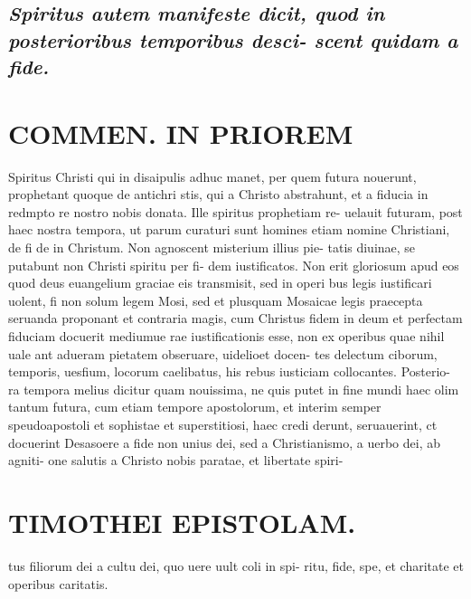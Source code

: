 \documentclass{article}
\begin{document}
\begin{pages}
\subsection*{\textit{\huge\textbf{S}\normalsize piritus autem manifeste dicit, quod in posterioribus temporibus desci- scent quidam a fide. }}
\section*{COMMEN. IN PRIOREM }
\marginpar{[ p.94 ]}\pstart Spiritus Christi qui in disaipulis adhuc manet, per quem futura nouerunt, prophetant quoque de antichri stis, qui a Christo abstrahunt, et a fiducia in redmpto re nostro nobis donata. Ille spiritus prophetiam re- uelauit futuram, post haec nostra tempora, ut parum curaturi sunt homines etiam nomine Christiani, de fi de in Christum. Non agnoscent misterium illius pie- tatis diuinae, se putabunt non Christi spiritu per fi- dem iustificatos. Non erit gloriosum apud eos quod deus euangelium graciae eis transmisit, sed in operi bus legis iustificari uolent, fi non solum legem Mosi, sed et plusquam Mosaicae legis praecepta seruanda proponant et contraria magis, cum Christus fidem in deum et perfectam fiduciam docuerit mediumue rae iustificationis esse, non ex operibus quae nihil uale ant adueram pietatem obseruare, uidelioet docen- tes delectum ciborum, temporis, uesfium, locorum caelibatus, his rebus iusticiam collocantes. Posterio- ra tempora melius dicitur quam nouissima, ne quis putet in fine mundi haec olim tantum futura, cum etiam tempore apostolorum, et interim semper speudoapostoli et sophistae et superstitiosi, haec credi derunt, seruauerint, ct docuerint Desasoere a fide non unius dei, sed a Christianismo, a uerbo dei, ab agniti- one salutis a Christo nobis paratae, et libertate spiri-  \pend
\section*{TIMOTHEI EPISTOLAM. }
\marginpar{[ p.95 ]}\pstart tus filiorum dei a cultu dei, quo uere uult coli in spi- ritu, fide, spe, et charitate et operibus caritatis.  \pend
{}
{}

\end{pages}
\end{document}
